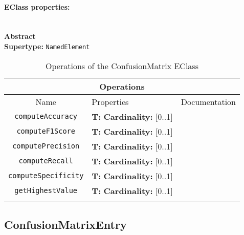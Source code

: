 \documentclass{article}
\begin{document}
\paragraph{EClass properties:} \hspace{0pt} \\ \indent
\textbf{Abstract}
\\
\textbf{Supertype: }\texttt{NamedElement}
\begin{table}[H]
\footnotesize
\begin{tabularx}{\textwidth}{|c| p{4 cm} | X |}
\hline
\multicolumn{3}{|c|}{\textbf{Operations}} \\
\hline
Name & Properties & Documentation \\ \hline \hline
\texttt{computeAccuracy}
 & 
\textbf{T:} \texttt{}
\newline
\textbf{Cardinality:} [0..1]
 & \\ \hline
\texttt{computeF1Score}
 & 
\textbf{T:} \texttt{}
\newline
\textbf{Cardinality:} [0..1]
 & \\ \hline
\texttt{computePrecision}
 & 
\textbf{T:} \texttt{}
\newline
\textbf{Cardinality:} [0..1]
 & \\ \hline
\texttt{computeRecall}
 & 
\textbf{T:} \texttt{}
\newline
\textbf{Cardinality:} [0..1]
 & \\ \hline
\texttt{computeSpecificity}
 & 
\textbf{T:} \texttt{}
\newline
\textbf{Cardinality:} [0..1]
 & \\ \hline
\texttt{getHighestValue}
 & 
\textbf{T:} \texttt{}
\newline
\textbf{Cardinality:} [0..1]
 & \\ \hline
\caption{Operations of the ConfusionMatrix EClass}
\end{tabularx}
\label{e4smConfusionMatrixop}
\end{table}
\subsection[ConfusionMatrixEntry]{ConfusionMatrixEntry}
\label{e4smConfusionMatrixEntry}
\end{document}
